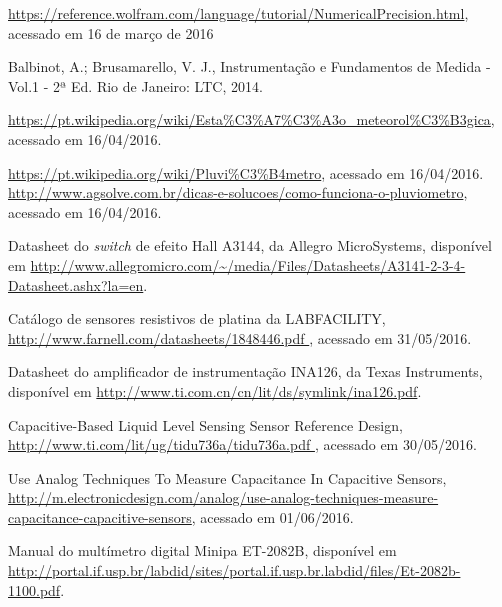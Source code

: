 \documentclass[a4paper]{instrumentacao}
\begin{document}
\newpage
\begin{thebibliography}{9}
 \url{https://reference.wolfram.com/language/tutorial/NumericalPrecision.html}, acessado em 16 de março de 2016

  Balbinot, A.; Brusamarello, V. J., Instrumentação e Fundamentos de Medida - Vol.1 - 2ª Ed. Rio de Janeiro: LTC, 2014.

 \url{https://pt.wikipedia.org/wiki/Esta\%C3\%A7\%C3\%A3o_meteorol\%C3\%B3gica}, acessado em 16/04/2016.

 \url{https://pt.wikipedia.org/wiki/Pluvi\%C3\%B4metro}, acessado em 16/04/2016.
 \url{http://www.agsolve.com.br/dicas-e-solucoes/como-funciona-o-pluviometro}, acessado em 16/04/2016.

 Datasheet do \textit{switch} de efeito Hall A3144, da Allegro MicroSystems, disponível em \url{http://www.allegromicro.com/~/media/Files/Datasheets/A3141-2-3-4-Datasheet.ashx?la=en}.

 Catálogo de sensores resistivos de platina da LABFACILITY, \url{http://www.farnell.com/datasheets/1848446.pdf }, acessado em 31/05/2016.

 Datasheet do amplificador de instrumentação INA126, da Texas Instruments, disponível em \url{http://www.ti.com.cn/cn/lit/ds/symlink/ina126.pdf}.

 Capacitive-Based Liquid Level Sensing Sensor Reference Design, \url{http://www.ti.com/lit/ug/tidu736a/tidu736a.pdf
}, acessado em 30/05/2016.

 Use Analog Techniques To Measure Capacitance In Capacitive Sensors, \url{http://m.electronicdesign.com/analog/use-analog-techniques-measure-capacitance-capacitive-sensors}, acessado em 01/06/2016.

 Manual do multímetro digital Minipa ET-2082B, disponível em \url{http://portal.if.usp.br/labdid/sites/portal.if.usp.br.labdid/files/Et-2082b-1100.pdf}.



\end{thebibliography}
\end{document}

